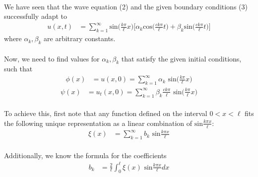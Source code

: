 \documentclass[letter]{article}
\begin{document}
    \paragraph{}We have seen that the wave equation (2) and the given boundary conditions (3) successfully adapt to
    \begin{equation}
        \begin{split}
            u(x,t) &= 
            \sum_{k=1}^\infty\text{sin}\bigg(\frac{k\pi}{\ell}x\bigg)\bigg[\alpha_k\text{cos}\bigg(\frac{ck\pi}{\ell}t\bigg)+\beta_k\text{sin}\bigg(\frac{ck\pi}{\ell}t\bigg)\bigg]
        \end{split}
    \end{equation}
    where $\alpha_k,\beta_k$ are arbitrary constants. 
    \paragraph{}Now, we need to find values for $\alpha_k,\beta_k$ that satisfy the given initial conditions, such that
    \begin{equation}
        \begin{split}
            \phi(x) &= u(x,0) = \sum_{k=1}^\infty\alpha_k\text{ sin}\bigg(\frac{k\pi}{\ell}x\bigg)
        \end{split}
    \end{equation}
    \begin{equation}
        \begin{split}
            \psi(x) &= u_t(x,0) = \sum_{k=1}^\infty\beta_k\frac{ck\pi}{\ell}\text{ sin}\bigg(\frac{k\pi}{\ell}x\bigg)
        \end{split}
    \end{equation}
    \paragraph{} To achieve this, first note that any function defined on the interval $0<x<\ell$ fits the following unique representation as a linear combination of $\text{sin}\frac{k\pi x}{\ell}$:
    \begin{equation}
        \begin{split}
            \xi(x) &= \sum_{k=1}^\infty b_k\text{ sin}\frac{k\pi x}{\ell}
        \end{split}
    \end{equation}
    \paragraph{}Additionally, we know the formula for the coefficients
    \begin{equation*}
        \begin{split}
            b_k &= \frac{2}{\ell}\int_{0}^{\ell}\xi(x)\text{ sin}\frac{k\pi x}{\ell}dx
        \end{split}
    \end{equation*}
\end{document}
